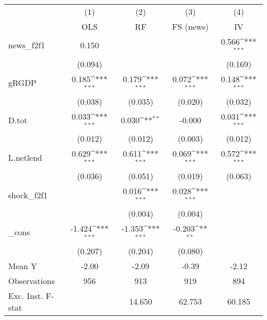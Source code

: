 {
\def\sym#1{\ifmmode^{#1}\else\(^{#1}\)\fi}
\begin{tabular}{l*{4}{c}}
\toprule
            &\multicolumn{1}{c}{(1)}&\multicolumn{1}{c}{(2)}&\multicolumn{1}{c}{(3)}&\multicolumn{1}{c}{(4)}\\
            &\multicolumn{1}{c}{OLS}&\multicolumn{1}{c}{RF}&\multicolumn{1}{c}{FS (news)}&\multicolumn{1}{c}{IV}\\
\midrule
news\_f2f1   &       0.150         &                     &                     &       0.566\sym{***}\\
            &     (0.094)         &                     &                     &     (0.169)         \\
\addlinespace
gRGDP       &       0.185\sym{***}&       0.179\sym{***}&       0.072\sym{***}&       0.148\sym{***}\\
            &     (0.038)         &     (0.035)         &     (0.020)         &     (0.032)         \\
\addlinespace
D.tot       &       0.033\sym{***}&       0.030\sym{**} &      -0.000         &       0.031\sym{***}\\
            &     (0.012)         &     (0.012)         &     (0.003)         &     (0.012)         \\
\addlinespace
L.netlend   &       0.629\sym{***}&       0.611\sym{***}&       0.069\sym{***}&       0.572\sym{***}\\
            &     (0.036)         &     (0.051)         &     (0.019)         &     (0.063)         \\
\addlinespace
shock\_f2f1  &                     &       0.016\sym{***}&       0.028\sym{***}&                     \\
            &                     &     (0.004)         &     (0.004)         &                     \\
\addlinespace
\_cons      &      -1.424\sym{***}&      -1.353\sym{***}&      -0.203\sym{**} &                     \\
            &     (0.207)         &     (0.204)         &     (0.080)         &                     \\
\midrule
Mean Y      &       -2.00         &       -2.09         &       -0.39         &       -2.12         \\
Observations&         956         &         913         &         919         &         894         \\
Exc. Inst. F-stat&                     &      14.650         &      62.753         &      60.185         \\
\bottomrule
\end{tabular}
}
